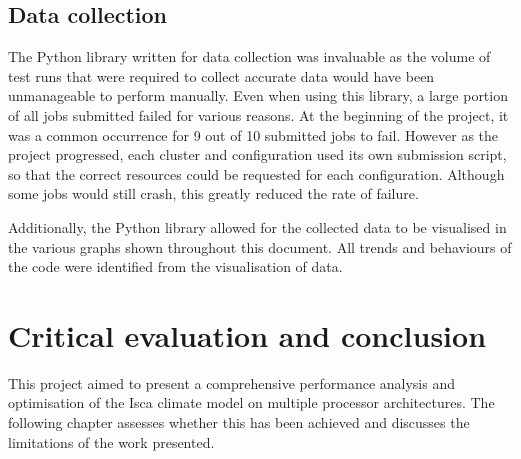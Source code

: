 \documentclass[a4paper,11pt]{report}
\begin{document}
\section{Data collection}
The Python library written for data collection was invaluable as the volume of test runs that were required to collect accurate data would have been unmanageable to perform manually. Even when using this library, a large portion of all jobs submitted failed for various reasons. At the beginning of the project, it was a common occurrence for 9 out of 10 submitted jobs to fail. However as the project progressed, each cluster and configuration used its own submission script, so that the correct resources could be requested for each configuration. Although some jobs would still crash, this greatly reduced the rate of failure.
\par
Additionally, the Python library allowed for the collected data to be visualised in the various graphs shown throughout this document. All trends and behaviours of the code were identified from the visualisation of data. 


\chapter{Critical evaluation and conclusion}
This project aimed to present a comprehensive performance analysis and optimisation of the Isca climate model on multiple processor architectures. The following chapter assesses whether this has been achieved and discusses the limitations of the work presented. 
\par
\end{document}
